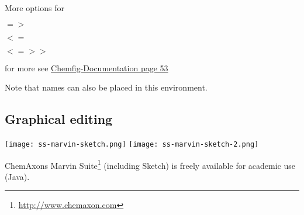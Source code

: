\begin{frame}

	More options for 
	\begin{mitemize}
		\item $=>$ \item $<=$ \item $<=>>$
	\end{mitemize}
	for more see \href{http://www.ctan.org/pkg/chemfig}{Chemfig-Documentation page
	53}
\end{frame}

\begin{frame}
	Note that names can also be placed in this environment.
\end{frame}


\subsection{Graphical editing}
\begin{frame}
	\begin{center}
		\texttt{[image: ss-marvin-sketch.png]}
		\texttt{[image: ss-marvin-sketch-2.png]}
	\end{center}
	ChemAxons Marvin Suite\footnote{\url{http://www.chemaxon.com}} (including Sketch) is freely available for academic
	use (Java).
\end{frame}

